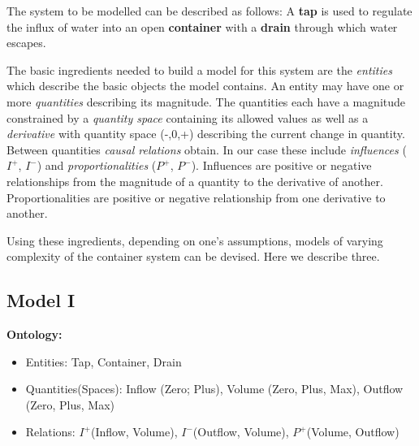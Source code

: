 \documentclass{article}
\begin{document}
The system to be modelled can be described as follows: A \textbf{tap} is used to regulate the influx of water into an open \textbf{container} with a \textbf{drain} through which water escapes.

The basic ingredients needed to build a model for this system are the \textit{entities} which describe the basic objects the model contains. An entity may have one or more \textit{quantities} describing its magnitude. The quantities each have a magnitude constrained by a \textit{quantity space} containing its allowed values as well as a \textit{derivative} with quantity space (-,0,+) describing the current change in quantity. Between quantities \textit{causal relations} obtain. In our case these include \textit{influences} ($I^+$, $I^-$) and \textit{proportionalities} ($P^+$, $P^-$). Influences are positive or negative relationships from the magnitude of a quantity to the derivative of another. Proportionalities are positive or negative relationship from one derivative to another.

Using these ingredients, depending on one's assumptions, models of varying complexity of the container system can be devised. Here we describe three. 

\subsection {Model I}

\textbf{Ontology:}
\begin{itemize}
	\item Entities: Tap, Container, Drain
	\item Quantities(Spaces): Inflow (Zero; Plus), Volume (Zero, Plus, Max), Outflow (Zero, Plus, Max)
	\item Relations: $I^+$(Inflow, Volume), $I^-$(Outflow, Volume), $P^+$(Volume, Outflow)
\end{itemize}
\end{document}
